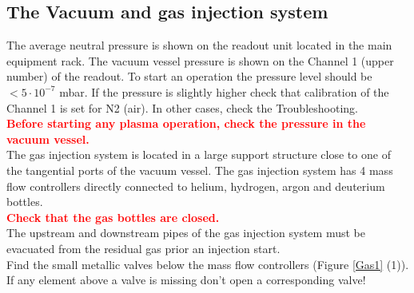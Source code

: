 \documentclass[fleqn,a4paper,20pt]{article}
\begin{document}
\begin{minipage}{.68\textwidth}
	
\subsection{The Vacuum and gas injection system}\label{Gasin1}

The average neutral pressure is shown on the readout unit located in the main equipment rack.	The vacuum vessel pressure is shown on the Channel 1 (upper number) of the readout. To start an operation the pressure level should be $< 5\cdot 10^{-7}$ mbar. If the pressure is slightly higher check that calibration of the Channel 1 is set for N2 (air). In other cases, check the Troubleshooting.\\

\textcolor{red}{\textbf{Before starting any plasma operation, check the pressure in the vacuum vessel.}}\\

The gas injection system is located in a large support structure close to one of the tangential ports of the vacuum vessel. The gas injection system has 4 mass flow controllers directly connected to helium, hydrogen, argon and deuterium bottles.\\

\textcolor{red}{\textbf{Check that the gas bottles are closed.}}\\

The upstream and downstream pipes of the gas injection system must be evacuated from the residual gas prior an injection start.\\

Find the small metallic valves below the mass flow controllers (Figure \ref{Gas1} (1)). If any element above a valve is missing don’t open a corresponding valve! \\

\end{minipage}
\begin{minipage}{.02\textwidth}
	$\ $\\
\end{minipage}
\end{document}
